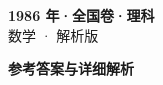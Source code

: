 \documentclass[zihao=-4, a4paper]{ctexart}
\begin{document}
\begin{center}
  {\Large\bfseries 1986 年·全国卷·理科}\\[4pt]
  {\large 数学 · 解析版}
\end{center}
\medskip
{}

\clearpage
{}
\begin{center}{\Large\bfseries 参考答案与详细解析}\end{center}
\medskip

\end{document}
